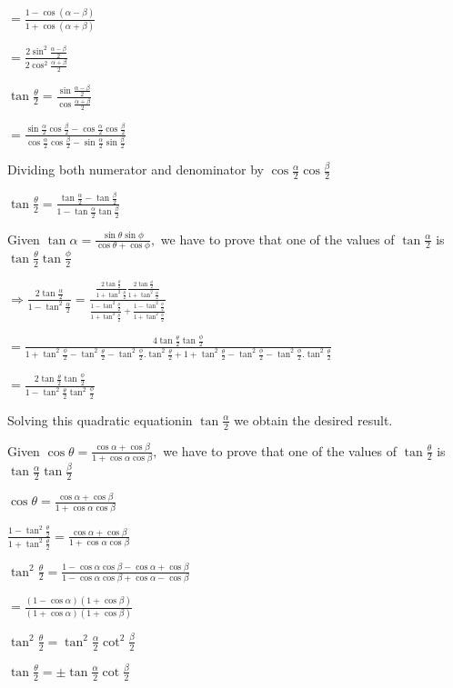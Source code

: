  $= \frac{1 - \cos(\alpha - \beta)}{1 + \cos(\alpha + \beta)}$

  $= \frac{2\sin^2\frac{\alpha - \beta}{2}}{2\cos^2\frac{\alpha + \beta}{2}}$

  $\tan\frac{\theta}{2} = \frac{\sin\frac{\alpha - \beta}{2}}{\cos\frac{\alpha + \beta}{2}}$

  $= \frac{\sin\frac{\alpha}{2}\cos\frac{\beta}{2} -
  \cos\frac{\alpha}{2}\cos\frac{\beta}{2}}{\cos\frac{\alpha}{2}\cos\frac{\beta}{2} - \sin\frac{\alpha}{2}\sin\frac{\beta}{2}}$

  Dividing both numerator and denominator by $\cos\frac{\alpha}{2}\cos\frac{\beta}{2}$

  $\tan\frac{\theta}{2} = \frac{\tan \frac{\alpha}{2} - \tan\frac{\beta}{2}}{1 -
    \tan\frac{\alpha}{2}\tan\frac{\beta}{2}}$

\item Given $\tan\alpha = \frac{\sin\theta\sin\phi}{\cos\theta + \cos\phi},$ we have to prove that one of the values of
  $\tan\frac{\alpha}{2}$ is $\tan\frac{\theta}{2}\tan\frac{\phi}{2}$

  $\Rightarrow \frac{2\tan\frac{\alpha}{2}}{1 - \tan^2\frac{\alpha}{2}} = \frac{\frac{2\tan\frac{\theta}{2}}{1 +
    \tan^2\frac{\theta}{2}}\frac{2\tan\frac{\phi}{2}}{1 + \tan^2\frac{\phi}{2}}}{\frac{1 - \tan^2\frac{\theta}{2}}{1 +
    \tan^2\frac{\theta}{2}} + \frac{1 - \tan^2\frac{\phi}{2}}{1 + \tan^2\frac{\phi}{2}}}$

  $= \frac{4\tan\frac{\theta}{2}\tan\frac{\phi}{2}}{1 + \tan^2\frac{\phi}{2} - \tan^2\frac{\theta}{2} -
  \tan^2\frac{\phi}{2}.\tan^2\frac{\theta}{2} + 1 + \tan^2\frac{\theta}{2} -\tan^2\frac{\phi}{2} -
  \tan^2\frac{\phi}{2}.\tan^2\frac{\theta}{2}}$

  $= \frac{2\tan\frac{\theta}{2}\tan\frac{\phi}{2}}{1 - \tan^2\frac{\theta}{2}\tan^2\frac{\phi}{2}}$

  Solving this quadratic equationin $\tan\frac{\alpha}{2}$ we obtain the desired result.

\item Given $\cos\theta = \frac{\cos\alpha + \cos\beta}{1 + \cos\alpha\cos\beta},$ we have to prove that one of the values of
  $\tan\frac{\theta}{2}$ is $\tan\frac{\alpha}{2}\tan\frac{\beta}{2}$

  $\cos\theta = \frac{\cos\alpha + \cos\beta}{1 + \cos\alpha\cos\beta}$

  $\frac{1 - \tan^2\frac{\theta}{2}}{1 + \tan^2\frac{\theta}{2}} = \frac{\cos\alpha + \cos\beta}{1 + \cos\alpha\cos\beta}$

  $\tan^2\frac{\theta}{2} = \frac{1 - \cos\alpha\cos\beta - \cos\alpha + \cos\beta}{1 - \cos\alpha\cos\beta + \cos\alpha -
  \cos\beta}$

  $= \frac{(1 - \cos\alpha)(1 + \cos\beta)}{(1 + \cos\alpha)(1 + \cos\beta)}$

  $\tan^2\frac{\theta}{2} = \tan^2\frac{\alpha}{2}\cot^2\frac{\beta}{2}$

  $\tan\frac{\theta}{2} = \pm\tan\frac{\alpha}{2}\cot\frac{\beta}{2}$
\stopitemize
